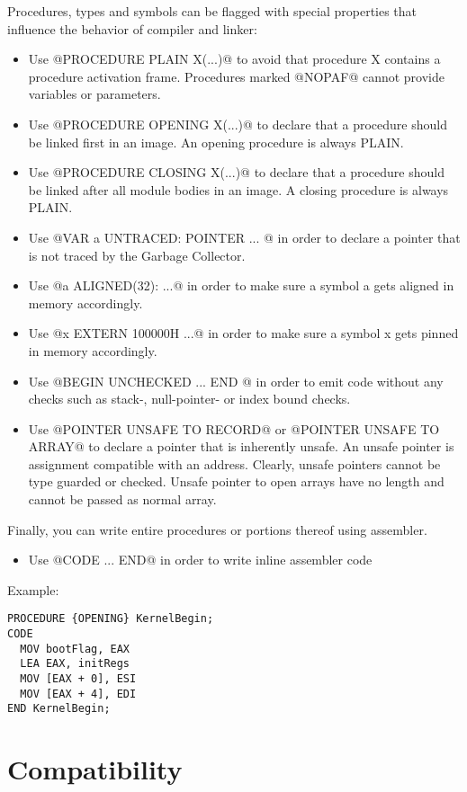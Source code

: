 \documentclass[a4wide,11pt]{article}
\begin{document}
\begin{annotation}
Procedures, types and symbols can be flagged with special properties that influence the behavior of compiler and linker:
\begin{itemize}
\item Use @PROCEDURE {PLAIN} X(...)@ to avoid that procedure X contains a procedure activation frame.
Procedures marked @NOPAF@ cannot provide variables or parameters.
\item Use @PROCEDURE {OPENING} X(...)@ to declare that a procedure should be linked first in an image.
An opening procedure is always PLAIN.
\item Use @PROCEDURE {CLOSING} X(...)@ to declare that a procedure should be linked after all module bodies in an image.
A closing procedure is always PLAIN.
\item Use @VAR a {UNTRACED}: POINTER ... @ in order to declare a pointer that is not traced by the Garbage Collector.
\item Use @a {ALIGNED(32)}: ...@ in order to make sure a symbol a gets aligned in memory accordingly.
\item Use @x EXTERN 100000H ...@ in order to make sure a symbol x gets pinned in memory accordingly.
\item Use @BEGIN {UNCHECKED} ... END @ in order to emit code without any checks such as stack-, null-pointer- or index bound checks.
\item Use @POINTER {UNSAFE} TO RECORD@ or @POINTER {UNSAFE} TO ARRAY@ to declare a pointer that is inherently unsafe.
An unsafe pointer is assignment compatible with an address.
Clearly, unsafe pointers cannot be type guarded or checked.
Unsafe pointer to open arrays have no length and cannot be passed as normal array.
\end{itemize}
Finally, you can write entire procedures or portions thereof using assembler.
\begin{itemize}
\item Use @CODE ... END@ in order to write inline assembler code
\end{itemize}
Example:
\begin{lstlisting}[style=example,caption={Code that is linked to the front of a kernel image.}]
PROCEDURE {OPENING} KernelBegin;
CODE
  MOV bootFlag, EAX
  LEA EAX, initRegs
  MOV [EAX + 0], ESI
  MOV [EAX + 4], EDI
END KernelBegin;
\end{lstlisting}

\end{annotation}

\section{Compatibility}\label{section:Compatibility}
\end{document}
